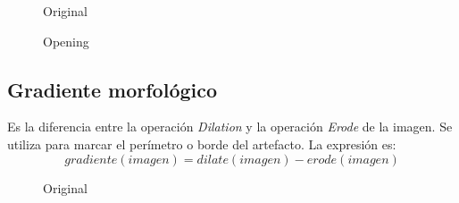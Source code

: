 \begin{figure}[H]
  \caption{Original}
  \centering \setlength\fboxsep{0pt} \setlength\fboxrule{0.5pt}
\end{figure}

\begin{figure}[H]
  \centering \setlength\fboxsep{0pt} \setlength\fboxrule{0.5pt}
  \caption{Opening}
\end{figure}

\subsection{Gradiente morfológico}
Es la diferencia entre la operación \emph{Dilation} y la operación
\emph{Erode} de la imagen. Se utiliza para marcar el perímetro o borde
del artefacto. La expresión es:
\begin{equation*}
  gradiente(imagen) = dilate(imagen) - erode(imagen)
\end{equation*}

\begin{figure}[H]
  \caption{Original}
  \centering \setlength\fboxsep{0pt} \setlength\fboxrule{0.5pt}
\end{figure}

